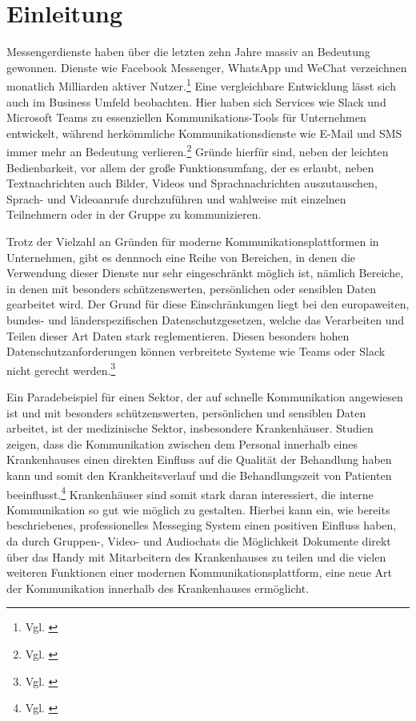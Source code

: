 \chapter{Einleitung}\label{chapter:einleitung}

Messengerdienste haben über die letzten zehn Jahre massiv an Bedeutung gewonnen. Dienste wie Facebook Messenger, WhatsApp und WeChat verzeichnen monatlich Milliarden aktiver Nutzer.\footnote{Vgl. \cite{Ballve2014}} Eine vergleichbare Entwicklung lässt sich auch im Business Umfeld beobachten. Hier haben sich Services wie Slack und Microsoft Teams zu essenziellen Kommunikations-Tools für Unternehmen entwickelt, während herkömmliche Kommunikationsdienste wie E-Mail und SMS immer mehr an Bedeutung verlieren.\footnote{Vgl. \cite{Rcihter2019}}
Gründe hierfür sind, neben der leichten Bedienbarkeit, vor allem der große Funktionsumfang, der es erlaubt, neben Textnachrichten auch Bilder, Videos und Sprachnachrichten auszutauschen, Sprach- und Videoanrufe durchzuführen und wahlweise mit einzelnen Teilnehmern oder in der Gruppe zu kommunizieren.

Trotz der Vielzahl an Gründen für moderne Kommunikationsplattformen in Unternehmen, gibt es dennnoch eine Reihe von Bereichen, in denen die Verwendung dieser Dienste nur sehr eingeschränkt möglich ist, nämlich Bereiche, in denen mit besonders schützenswerten, persönlichen oder sensiblen Daten gearbeitet wird. Der Grund für diese Einschränkungen liegt bei den europaweiten, bundes- und länderspezifischen Datenschutzgesetzen, welche das Verarbeiten und Teilen dieser Art Daten stark reglementieren. Diesen besonders hohen Datenschutzanforderungen können verbreitete Systeme wie Teams oder Slack nicht gerecht werden.\footnote{Vgl. \cite[S. 1 ff.]{Datenschutzkonferenz2019}}

Ein Paradebeispiel für einen Sektor, der auf schnelle Kommunikation angewiesen ist und mit besonders schützenswerten, persönlichen und sensiblen Daten arbeitet, ist der medizinische Sektor, insbesondere Krankenhäuser. Studien zeigen, dass die Kommunikation zwischen dem Personal innerhalb eines Krankenhauses einen direkten Einfluss auf die Qualität der Behandlung haben kann und somit den Krankheitsverlauf und die Behandlungszeit von Patienten beeinflusst.\footnote{Vgl. \cite[S. 1292 f.]{G.Murphy2010}} Krankenhäuser sind somit stark daran interessiert, die interne Kommunikation so gut wie möglich zu gestalten. Hierbei kann ein, wie bereits beschriebenes, professionelles Messeging System einen positiven Einfluss haben, da durch Gruppen-, Video- und Audiochats die Möglichkeit Dokumente direkt über das Handy mit Mitarbeitern des Krankenhauses zu teilen und die vielen weiteren Funktionen einer modernen Kommunikationsplattform, eine neue Art der Kommunikation innerhalb des Krankenhauses ermöglicht.

